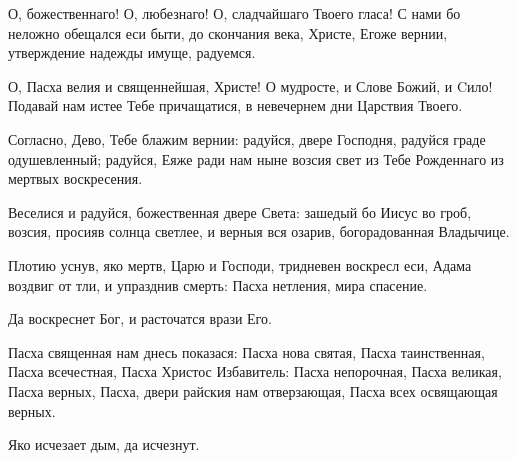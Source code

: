 \begin{mymulticols}




О, божественнаго! О, любезнаго! О, сладчайшаго Твоего гласа! С нами бо неложно обещался еси быти, до скончания века, Христе, Егоже вернии,  утверждение надежды имуще, радуемся. 


О, Пасха велия и священнейшая, Христе! О мудросте, и Слове Божий, и Cило! Подавай нам истее Тебе причащатися, в невечернем дни Царствия Твоего. 



Согласно, Дево, Тебе блажим вернии: радуйся, двере Господня, радуйся граде одушевленный; радуйся, Еяже ради нам ныне возсия свет из Тебе Рожденнаго из мертвых воскресения. 


Веселися и радуйся, божественная двере Света: зашедый бо Иисус во гроб, возсия, просияв солнца светлее, и верныя вся озарив, богорадованная Владычице. 


Плотию уснув, яко мертв, Царю и Господи, тридневен воскресл еси, Адама воздвиг от тли, и упразднив смерть: Пасха нетления, мира спасение.  


 Да воскреснет Бог, и расточатся врази Его. 

Пасха священная нам днесь показася: Пасха нова святая, Пасха таинственная, Пасха всечестная, Пасха Христос Избавитель: Пасха непорочная, Пасха великая, Пасха верных, Пасха, двери райския нам отверзающая, Пасха всех освящающая верных. 

 Яко исчезает дым, да исчезнут. 


\end{mymulticols}
